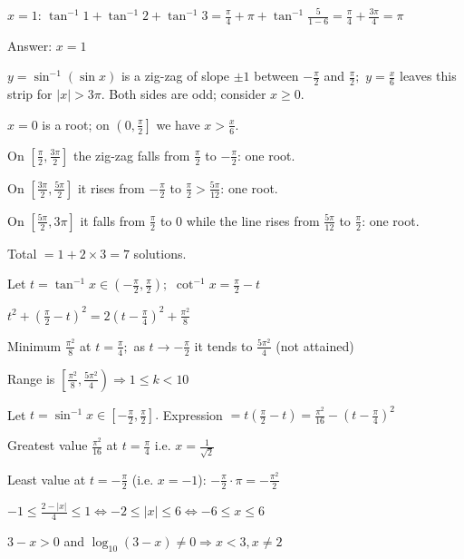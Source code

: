   $x = 1$: $\tan^{-1}1 + \tan^{-1}2 + \tan^{-1}3 = \frac{\pi}{4} + \pi + \tan^{-1}\frac{5}{1 - 6} = \frac{\pi}{4} + \frac{3\pi}{4} = \pi$

  Answer: $x = 1$

\item $y = \sin^{-1}(\sin x)$ is a zig-zag of slope $\pm1$ between $-\frac{\pi}{2}$ and $\frac{\pi}{2};$ $y = \frac{x}{6}$
  leaves this strip for $|x| > 3\pi.$ Both sides are odd; consider $x\geq 0.$

  $x = 0$ is a root; on $\left(0, \frac{\pi}{2}\right]$ we have $x > \frac{x}{6}.$

  On $\left[\frac{\pi}{2}, \frac{3\pi}{2}\right]$ the zig-zag falls from $\frac{\pi}{2}$ to $-\frac{\pi}{2}$: one root.

  On $\left[\frac{3\pi}{2}, \frac{5\pi}{2}\right]$ it rises from $-\frac{\pi}{2}$ to $\frac{\pi}{2} > \frac{5\pi}{12}$: one root.

  On $\left[\frac{5\pi}{2}, 3\pi\right]$ it falls from $\frac{\pi}{2}$ to $0$ while the line rises from $\frac{5\pi}{12}$ to
  $\frac{\pi}{2}$: one root.

  Total $= 1 + 2\times3 = 7$ solutions.

\item Let $t = \tan^{-1}x\in\left(-\frac{\pi}{2}, \frac{\pi}{2}\right);$ $\cot^{-1}x = \frac{\pi}{2} - t$

  $t^2 + \left(\frac{\pi}{2} - t\right)^2 = 2\left(t - \frac{\pi}{4}\right)^2 + \frac{\pi^2}{8}$

  Minimum $\frac{\pi^2}{8}$ at $t = \frac{\pi}{4};$ as $t\to-\frac{\pi}{2}$ it tends to $\frac{5\pi^2}{4}$ (not attained)

  Range is $\left[\frac{\pi^2}{8}, \frac{5\pi^2}{4}\right) \Rightarrow 1\leq k < 10$

\item Let $t = \sin^{-1}x\in\left[-\frac{\pi}{2}, \frac{\pi}{2}\right].$ Expression $= t\left(\frac{\pi}{2} - t\right) =
  \frac{\pi^2}{16} - \left(t - \frac{\pi}{4}\right)^2$

  Greatest value $\frac{\pi^2}{16}$ at $t = \frac{\pi}{4}$ i.e. $x = \frac{1}{\sqrt{2}}$

  Least value at $t = -\frac{\pi}{2}$ (i.e. $x = -1$): $-\frac{\pi}{2}\cdot\pi = -\frac{\pi^2}{2}$

\item $-1\leq \frac{2 - |x|}{4}\leq 1 \iff -2\leq |x|\leq 6 \iff -6\leq x\leq 6$

  $3 - x > 0$ and $\log_{10}(3 - x)\neq 0 \Rightarrow x < 3, x\neq 2$

